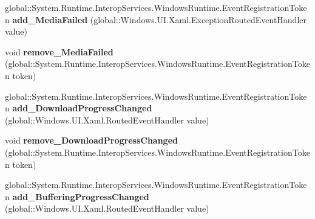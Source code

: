 \begin{DoxyCompactItemize}
\item 
\mbox{\label{interface_windows_1_1_u_i_1_1_xaml_1_1_controls_1_1_i_media_element_ad3294027d9bad7858a991bb3a8b07ef8}} 
global\+::\+System.\+Runtime.\+Interop\+Services.\+Windows\+Runtime.\+Event\+Registration\+Token {\bfseries add\+\_\+\+Media\+Failed} (global\+::\+Windows.\+U\+I.\+Xaml.\+Exception\+Routed\+Event\+Handler value)
\item 
\mbox{\label{interface_windows_1_1_u_i_1_1_xaml_1_1_controls_1_1_i_media_element_afb81febce56b850ab6cff6148327aaea}} 
void {\bfseries remove\+\_\+\+Media\+Failed} (global\+::\+System.\+Runtime.\+Interop\+Services.\+Windows\+Runtime.\+Event\+Registration\+Token token)
\item 
\mbox{\label{interface_windows_1_1_u_i_1_1_xaml_1_1_controls_1_1_i_media_element_a57e937eee241a696cb1b801e5d5d4291}} 
global\+::\+System.\+Runtime.\+Interop\+Services.\+Windows\+Runtime.\+Event\+Registration\+Token {\bfseries add\+\_\+\+Download\+Progress\+Changed} (global\+::\+Windows.\+U\+I.\+Xaml.\+Routed\+Event\+Handler value)
\item 
\mbox{\label{interface_windows_1_1_u_i_1_1_xaml_1_1_controls_1_1_i_media_element_a8aaeaafe6a46fee402a829a599d1aae3}} 
void {\bfseries remove\+\_\+\+Download\+Progress\+Changed} (global\+::\+System.\+Runtime.\+Interop\+Services.\+Windows\+Runtime.\+Event\+Registration\+Token token)
\item 
\mbox{\label{interface_windows_1_1_u_i_1_1_xaml_1_1_controls_1_1_i_media_element_a84b55fbe2bab2bbb0288457d0c16c52c}} 
global\+::\+System.\+Runtime.\+Interop\+Services.\+Windows\+Runtime.\+Event\+Registration\+Token {\bfseries add\+\_\+\+Buffering\+Progress\+Changed} (global\+::\+Windows.\+U\+I.\+Xaml.\+Routed\+Event\+Handler value)
\item 
\mbox{\label{interface_windows_1_1_u_i_1_1_xaml_1_1_controls_1_1_i_media_element_a080932b18d45c0da51366f4fe31041cf}} 

\end{DoxyCompactItemize}
